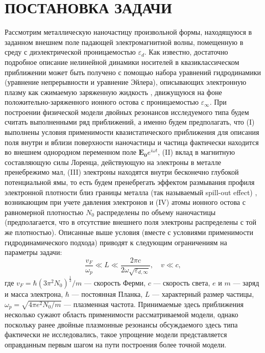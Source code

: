 \documentclass[12pt, a4paper]{article}
\renewcommand{\vec}{\mathbf}
\def \eps {\varepsilon}
\def \w {\omega}
\begin{document}
\section{ПОСТАНОВКА ЗАДАЧИ}

{Рассмотрим металлическую наночастицу }произвольной формы, находящуюся в заданном внешнем поле падающей электромагнитной волны, 
помещенную в среду с диэлектрической проницаемостью $\eps_d$. Как известно, достаточно подробное описание нелинейной динамики носителей в квазиклассическом приближении может быть получено с помощью набора уравнений гидродинамики (уравнение непрерывности и уравнение Эйлера), описывающих электронную плазму как сжимаемую заряженную жидкость  %
\cite{Boardman1982, Forstmann1986,Sipe1980,David2011}, движущуюся на фоне положительно-заряженного ионного остова с проницаемостью $\eps_\infty$. 
При построении физической модели двойных резонансов исследуемого типа будем считать выполненными ряд приближений, а именно будем предполагать, что (I) 
выполнены условия применимости
квазистатического приближения для описания поля внутри и вблизи поверхности наночастицы и частица фактически находится во внешнем однородном переменном поле $\vec{E_0}e^{i\w t}$, (II) вклад в магнитную составляющую силы Лоренца, действующую на электроны в металле пренебрежимо мал, (III) электроны находятся внутри бесконечно глубокой потенциальной ямы, то есть будем пренебрегать эффектом размывания профиля электронной плотности близ границы металла (так называемый spill-out effect) \cite{Takeuchi2022,Jin2015,Zhou2021}, возникающим при учете давления электронов и (IV) атомы ионного остова с равномерной плотностью $N_0$ распределены по объему наночастицы (предполагается, что в отсутствие внешнего поля электроны распределены с той же плотностью). Описанные выше условия (вместе с условиями применимости гидродинамического подхода) приводят к следующим ограничениям на параметры задачи: 
\begin{equation} 	
\frac{v_F}{\omega_p} \ll L \ll \frac{2\pi c}{2\omega\sqrt{\eps_{d, \infty}}},  \quad v \ll c, 
\end{equation} 
где $v_F = \hbar (3 \pi^2 N_0)^\frac{1}{3}/m $ — скорость Ферми, $c$ — скорость света, $e$ и $m$ — заряд и масса электрона, $\hbar$ — постоянная Планка, $L$ — характерный размер частицы, $ \w_p = 
\sqrt{4 \pi e^2 N_0 / m}$  — плазменная частота. Принимаемые здесь приближения несколько сужают область применимости рассматриваемой модели, однако поскольку ранее двойные плазмонные резонансы обсуждаемого здесь типа фактически не исследовались, такое упрощение модели представляется оправданным первым шагом на пути построения более точной модели. 
\end{document}
